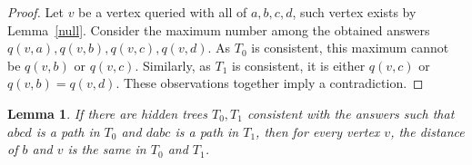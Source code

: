 \documentclass[12pt,a4paper]{amsart}
\theoremstyle{plain}
\newtheorem{lemma}[theorem]{Lemma}
\theoremstyle{definition}
\begin{document}
\begin{proof}
    Let $v$ be a vertex queried with all of $a,b,c,d$, such vertex exists by Lemma~\ref{null}. Consider the maximum number among the obtained answers $q(v,a), q(v,b), q(v,c), q(v,d)$. As $T_0$ is consistent, this maximum cannot be $q(v,b)$ or $q(v,c)$. Similarly, as $T_1$ is consistent, it is either $q(v,c)$ or $q(v,b)=q(v,d)$. These observations together imply a contradiction. 
\end{proof}

\begin{lemma}\label{lemnew1}
    If there are hidden trees $T_0,T_1$ consistent with the answers such that $abcd$ is a path in $T_0$ and $dabc$ is a path in $T_1$, then for every vertex $v$, the distance of $b$ and $v$ is the same in $T_0$ and $T_1$.
\end{lemma}
\end{document}
